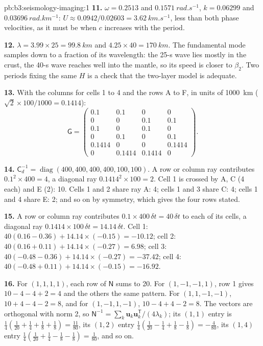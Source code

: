 \begin{solution}{pb:b3:seismology-imaging:1}
\textbf{11.} $\omega = 0.2513$ and $\qty{0.1571}{rad.s^{-1}}$, $k = 0.06299$ and
$\qty{0.03696}{rad.km^{-1}}$: $U \approx 0.0942/0.02603 = \qty{3.62}{km.s^{-1}}$,
less than both phase velocities, as it must be when $c$ increases with the
period.

\textbf{12.} $\lambda = 3.99\times25 = \qty{99.8}{km}$ and $4.25\times40 =
\qty{170}{km}$. The fundamental mode samples down to a fraction of its
wavelength: the 25-s wave lies mostly in the crust, the 40-s wave reaches well
into the mantle, so its speed is closer to $\beta_2$. Two periods fixing the
same $H$ is a check that the two-layer model is adequate.

\textbf{13.} With the columns for cells 1 to 4 and the rows A to F, in units
of \qty{1000}{km} ($\sqrt2\times100/1000 = 0.1414$):
\[
  \mathsf G = \begin{pmatrix}
  0.1 & 0.1 & 0 & 0 \\ 0 & 0 & 0.1 & 0.1 \\ 0.1 & 0 & 0.1 & 0 \\
  0 & 0.1 & 0 & 0.1 \\ 0.1414 & 0 & 0 & 0.1414 \\ 0 & 0.1414 & 0.1414 & 0
  \end{pmatrix}.
\]

\textbf{14.} $\mathsf C_d^{-1} = \operatorname{diag}(400, 400, 400, 400, 100,
100)$. A row or column ray contributes $0.1^2\times400 = 4$, a diagonal ray
$0.1414^2\times100 = 2$. Cell 1 is crossed by A, C (4 each) and E (2): 10. Cells
1 and 2 share ray A: 4; cells 1 and 3 share C: 4; cells 1 and 4 share E: 2; and
so on by symmetry, which gives the four rows stated.

\textbf{15.} A row or column ray contributes $0.1\times400\,\delta t = 40\,
\delta t$ to each of its cells, a diagonal ray $0.1414\times100\,\delta t =
14.14\,\delta t$. Cell 1: $40(0.16 - 0.36) + 14.14\times(-0.15) = -10.12$; cell
2: $40(0.16 + 0.11) + 14.14\times(-0.27) = 6.98$; cell 3: $40(-0.48 - 0.36) +
14.14\times(-0.27) = -37.42$; cell 4: $40(-0.48 + 0.11) + 14.14\times(-0.15) =
-16.92$.

\textbf{16.} For $(1,1,1,1)$, each row of $\mathsf N$ sums to 20. For
$(1,-1,-1,1)$, row 1 gives $10 - 4 - 4 + 2 = 4$ and the others the same
pattern. For $(1,1,-1,-1)$, $10 + 4 - 4 - 2 = 8$, and for $(1,-1,1,-1)$,
$10 - 4 + 4 - 2 = 8$. The vectors are orthogonal with norm 2, so
$\mathsf N^{-1} = \sum_k \mathbf u_k\mathbf u_k^{\mathsf T}/(4\lambda_k)$; its
$(1,1)$ entry is $\tfrac14(\tfrac1{20} + \tfrac14 + \tfrac18 + \tfrac18) =
\tfrac{11}{80}$, its $(1,2)$ entry $\tfrac14(\tfrac1{20} - \tfrac14 + \tfrac18
- \tfrac18) = -\tfrac4{80}$, its $(1,4)$ entry $\tfrac14(\tfrac1{20} +
\tfrac14 - \tfrac18 - \tfrac18) = \tfrac1{80}$, and so on.


\end{solution}
